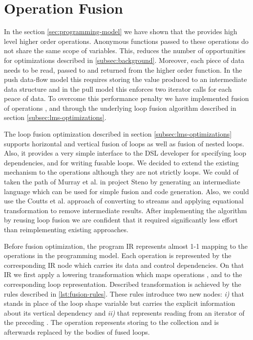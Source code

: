 \section{Operation Fusion}
\label{sec:fusion}

In the section \ref{sec:programming-model} we have shown that the  provides high level higher order operations. Anonymous functions passed to these operations do not share the same scope of variables. This, reduces the number of opportunities for optimizations described in \ref{subsec:background}. Moreover, each piece of data needs to be read, passed to and returned from the higher order function. In the push data-flow model this requires storing the value produced to an intermediate data structure and in the pull model this enforces two iterator calls \cite{Steno} for each peace of data. To overcome this performance penalty we have implemented fusion of operations ,  and  through the underlying loop fusion algorithm described in section \ref{subsec:lms-optimizations}. 

The loop fusion optimization described in section \ref{subsec:lms-optimizations} supports horizontal and vertical fusion of loops as well as fusion of nested loops. Also, it provides a very simple interface to the DSL developer for specifying loop dependencies, and for writing fusable loops. We decided to extend the existing mechanism to the  operations although they are not strictly loops. We could of taken the path of Murray et al. in project Steno \cite{murray_steno:_2011} by generating an intermediate language which can be used for simple fusion and code generation. Also, we could use the Coutts et al. \cite{coutts_stream_2007} approach of converting  to streams and applying equational transformation to remove intermediate results. After implementing the algorithm by reusing loop fusion we are confident that it required significantly less effort than reimplementing existing approaches.

Before fusion optimization, the program IR represents almost 1-1 mapping to the operations in the programming model. Each operation is represented by the corresponding IR node which carries its data and control dependencies. On that IR we first apply a lowering transformation which maps operations ,  and  to the corresponding loop representation. Described transformation is achieved by the rules described in \ref{lst:fusion-rules}. These rules introduce two new nodes: \emph{i)}  that stands in place of the loop shape variable but carries the explicit information about its vertical dependency and \emph{ii)}  that represents reading from an iterator of the preceding . The  operation represents storing to the collection and is afterwards replaced by the bodies of fused loops.

